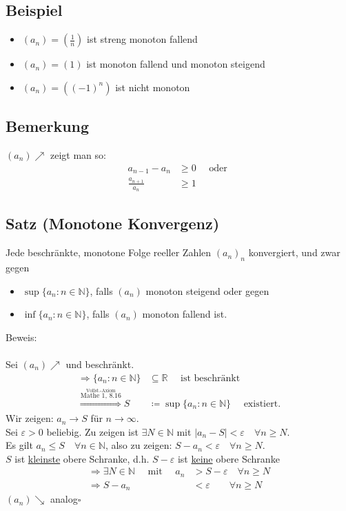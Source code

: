 \documentclass[12pt, titlepage]{article}
\newcommand{\R}{\mathds{R}}
\newcommand{\N}{\mathds{N}}
\newcommand{\infn}{n\rightarrow\infty}
\renewcommand{\>}{\rightarrow}
\renewcommand{\*}{\cdot}
\renewcommand{\epsilon}{\varepsilon}
\begin{document}
	\subsection{Beispiel}
	\begin{itemize}
		\item $(a_n)=(\frac{1}{n})$ ist streng monoton fallend
		\item $(a_n)=(1)$ ist monoton fallend und monoton steigend
		\item $(a_n)=((-1)^n)$ ist nicht monoton
	\end{itemize}
	\subsection{Bemerkung}
	$(a_n)\nearrow$ zeigt man so:
	\begin{align*}
		a_{n-1}-a_n&\geq0\quad\textrm{ oder }\\
		\frac{a_{n+1}}{a_n}&\geq1 
	\end{align*}
	\subsection{Satz (Monotone Konvergenz)}
	Jede beschränkte, monotone Folge reeller Zahlen $(a_n)_n$ konvergiert, und zwar gegen
	\begin{itemize}
		\item $\sup\{a_n\colon n\in\N\}$, falls $(a_n)$ monoton steigend oder gegen
		\item $\inf\{a_n\colon n\in\N\}$, falls $(a_n)$ monoton fallend ist.
	\end{itemize}
	Beweis:\\
	\\
	Sei $(a_n)\nearrow$ und beschränkt.
	\begin{align*}
		\Rightarrow \{a_n\colon n\in\N\}&\subseteq\R\quad\textrm{ ist beschränkt}\\
		\overset{\overset{\textrm{Vollst.-Axiom}}{\textrm{Mathe 1, 8.16}}}{\Rightarrow}S&\coloneqq\sup\{a_n\colon n\in\N\}\quad\textrm{ existiert.}
	\end{align*}
	Wir zeigen: $a_n\> S$ für $\infn$.\\
	Sei $\epsilon>0$ beliebig. Zu zeigen ist $\exists N\in\N$ mit $|a_n-S|<\epsilon\quad\forall n\geq N$.\\
	Es gilt $a_n\leq S\quad\forall n\in\N$, also zu zeigen: $S-a_n<\epsilon\quad\forall n\geq N$.\\
	$S$ ist \underline{kleinste} obere Schranke, d.h. $S-\epsilon$ ist \underline{keine} obere Schranke\\
	\begin{align*}
		\Rightarrow\exists N\in\N\quad\textrm{ mit }\quad a_n&>S-\epsilon\quad\forall n\geq N\\
		\Rightarrow S-a_n&<\epsilon\qquad\forall n\geq N
	\end{align*}
	$(a_n)\searrow$ analog\hfill$\square$
\end{document}
